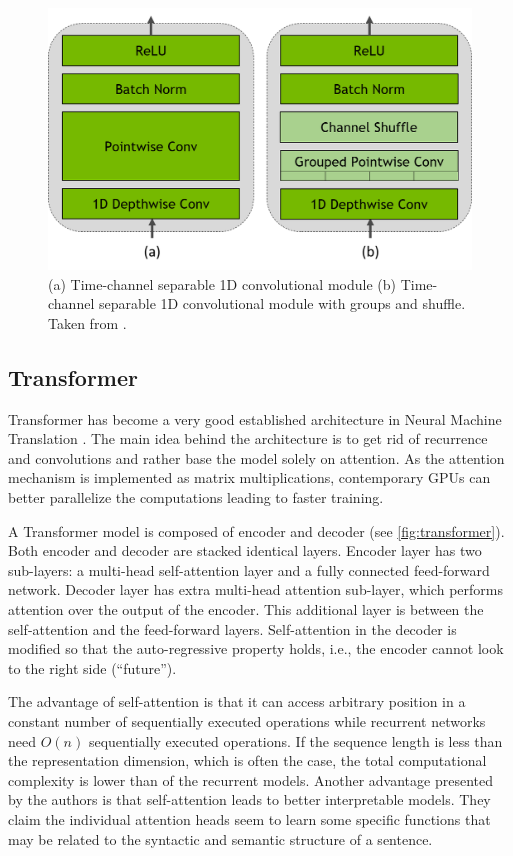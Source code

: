 \begin{figure}[h]
	\centering
	\includegraphics[width=0.8\linewidth]{img/QuartzNet_Grouped_v2.png}
	\caption{(a) Time-channel separable 1D convolutional module (b) Time-channel separable 1D convolutional module with groups and shuffle. Taken from .}
	\label{fig:quartz_arch_groups}
\end{figure}


\subsection{Transformer}
Transformer  has become a very good established architecture in Neural Machine Translation . The main idea behind the architecture is to get rid of recurrence and convolutions and rather base the model solely on attention. As the attention mechanism is implemented as matrix multiplications, contemporary GPUs can better parallelize the computations leading to faster training.

A Transformer model is composed of encoder and decoder (see \cref{fig:transformer}). Both encoder and decoder are stacked identical layers. Encoder layer has two sub-layers: a multi-head self-attention layer and a fully connected feed-forward network. Decoder layer has extra multi-head attention sub-layer, which performs attention over the output of the encoder. This additional layer is between the self-attention and the feed-forward layers. Self-attention in the decoder is modified so that the auto-regressive property holds, i.e., the encoder cannot look to the right side (``future'').

The advantage of self-attention is that it can access arbitrary position in a constant number of sequentially executed operations while recurrent networks need $O(n)$ sequentially executed operations. If the sequence length is less than the representation dimension, which is often the case, the total computational complexity is lower than of the recurrent models. Another advantage presented by the authors is that self-attention leads to better interpretable models. They claim the individual attention heads seem to learn some specific functions that may be related to the syntactic and semantic structure of a sentence.

